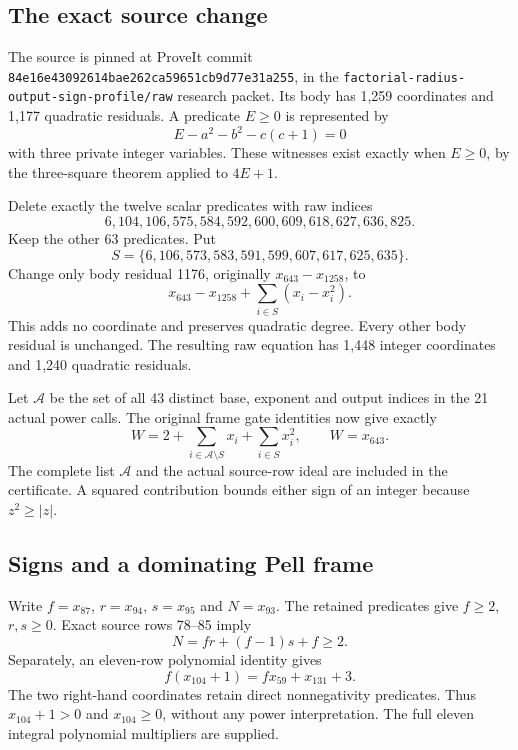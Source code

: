 \subsection{The exact source change}

The source is pinned at ProveIt commit
\texttt{84e16e43092614bae262ca59651cb9d77e31a255}, in the
\texttt{factorial-radius-output-sign-profile/raw} research packet.
Its body has 1,259 coordinates and 1,177 quadratic residuals.  A
predicate $E\ge0$ is represented by
\[
 E-a^2-b^2-c(c+1)=0
\]
with three private integer variables.  These witnesses exist exactly
when $E\ge0$, by the three-square theorem applied to $4E+1$.

Delete exactly the twelve scalar predicates with raw indices
\[
 6,104,106,575,584,592,600,609,618,627,636,825.
\]
Keep the other 63 predicates.  Put
\[
 S=\{6,106,573,583,591,599,607,617,625,635\}.
\]
Change only body residual 1176, originally $x_{643}-x_{1258}$, to
\[
 x_{643}-x_{1258}+\sum_{i\in S}(x_i-x_i^2).
\]
This adds no coordinate and preserves quadratic degree.  Every other
body residual is unchanged.  The resulting raw equation has 1,448
integer coordinates and 1,240 quadratic residuals.

Let $\mathcal A$ be the set of all 43 distinct base, exponent and
output indices in the 21 actual power calls.  The original frame
gate identities now give exactly
\begin{equation}
 W=2+\sum_{i\in\mathcal A\setminus S}x_i+\sum_{i\in S}x_i^2,
 \qquad W=x_{643}.
 \label{eq:direct-signed-frame}
\end{equation}
The complete list $\mathcal A$ and the actual source-row ideal are
included in the certificate.  A squared contribution bounds either
sign of an integer because $z^2\ge |z|$.

\subsection{Signs and a dominating Pell frame}

Write $f=x_{87}$, $r=x_{94}$, $s=x_{95}$ and $N=x_{93}$.  The
retained predicates give $f\ge2$, $r,s\ge0$.  Exact source rows
78--85 imply
\[
 N=fr+(f-1)s+f\ge2.
\]
Separately, an eleven-row polynomial identity gives
\begin{equation}
 f(x_{104}+1)=f x_{59}+x_{131}+3.
 \label{eq:direct-output104}
\end{equation}
The two right-hand coordinates retain direct nonnegativity predicates.
Thus $x_{104}+1>0$ and $x_{104}\ge0$, without any power interpretation.
The full eleven integral polynomial multipliers are supplied.

